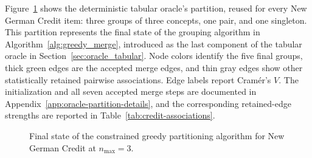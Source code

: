 Figure~\ref{fig:german-credit-grouping-final} shows the deterministic tabular oracle's partition, reused for every New German Credit item: three groups of three concepts, one pair, and one singleton. This partition represents the final state of the grouping algorithm in Algorithm~\ref{alg:greedy_merge}, introduced as the last component of the tabular oracle in Section~\ref{sec:oracle_tabular}. Node colors identify the five final groups, thick green edges are the accepted merge edges, and thin gray edges show other statistically retained pairwise associations. Edge labels report Cram\'er's $V$. The initialization and all seven accepted merge steps are documented in Appendix~\ref{app:oracle-partition-details}, and the corresponding retained-edge strengths are reported in Table~\ref{tab:credit-associations}.

\begin{figure}[htb]
  \centering
  
  \caption[Final oracle partition for New German Credit]{Final state of the constrained greedy partitioning algorithm for New German Credit at $n_{\max}=3$.}
  \label{fig:german-credit-grouping-final}
\end{figure}
